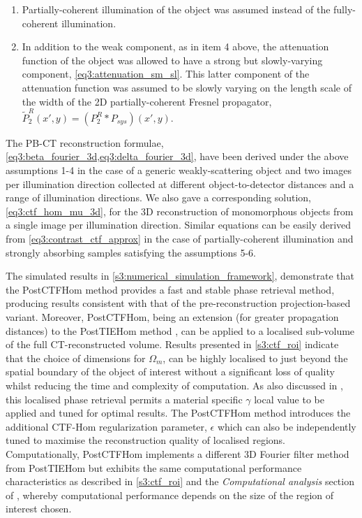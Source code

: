 \documentclass[twocolumn, switch]{article} %
\begin{document}
\begin{enumerate} \label{s3:conclusion}
    \setcounter{enumi}{4}
    \item  Partially-coherent illumination of the object was assumed instead of the fully-coherent illumination.
    \item In addition to the weak component, as in item 4 above, the attenuation function of the object was allowed to have a strong but slowly-varying component, \cref{eq3:attenuation_sm_sl}. This latter component of the attenuation function was assumed to be slowly varying on the length scale of the width of the 2D partially-coherent Fresnel propagator, $\tilde P_2^R\left( {x',y} \right) = \left( {P_2^R * {P_{sys}}} \right)\left( {x',y} \right)$.
\end{enumerate}

The PB-CT reconstruction formulae, \cref{eq3:beta_fourier_3d,eq3:delta_fourier_3d}, have been derived under the above assumptions 1-4 in the case of a generic weakly-scattering object and two images per illumination direction collected at different object-to-detector distances and a range of illumination directions. We also gave a corresponding solution, \cref{eq3:ctf_hom_mu_3d}, for the 3D reconstruction of monomorphous objects from a single image per illumination direction. Similar equations can be easily derived from \cref{eq3:contrast_ctf_approx} in the case of partially-coherent illumination and strongly absorbing samples satisfying the assumptions 5-6.

The simulated results in \cref{s3:numerical_simulation_framework}, demonstrate that the PostCTFHom method provides a fast and stable phase retrieval method, producing results consistent with that of the pre-reconstruction projection-based variant. Moreover, PostCTFHom, being an extension (for greater propagation distances) to the PostTIEHom method \cite{Thompson2019FastTomography}, can be applied to a localised sub-volume of the full CT-reconstructed volume. Results presented in \cref{s3:ctf_roi} indicate that the choice of dimensions for ${\Omega _m}$, can be highly localised to just beyond the spatial boundary of the object of interest without a significant loss of quality whilst reducing the time and complexity of computation. As also discussed in \cite{Thompson2019FastTomography}, this localised phase retrieval permits a material specific $\gamma$ local value to be applied and tuned for optimal results. The PostCTFHom method introduces the additional CTF-Hom regularization parameter, $\epsilon$ which can also be independently tuned to maximise the reconstruction quality of localised regions.  Computationally, PostCTFHom implements a different 3D Fourier filter method from PostTIEHom but exhibits the same computational performance characteristics as described in  \cref{s3:ctf_roi} and the \textit{Computational analysis} section of \cite{Thompson2019FastTomography}, whereby computational performance depends on the size of the region of interest chosen. 
\end{document}
